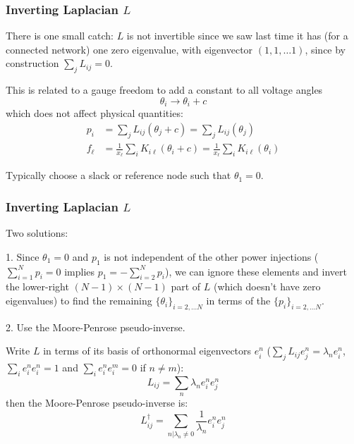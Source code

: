\documentclass[10pt,aspectratio=169,dvipsnames]{beamer}
\def\l{\lambda}
\begin{document}
\begin{frame}
  \frametitle{Inverting Laplacian $L$}

  There is one small catch: $L$ is \alert{not invertible} since we saw last
  time it has (for a connected network) one zero eigenvalue, with
  eigenvector $(1,1, \dots 1)$, since by construction $\sum_j L_{ij} =
  0$.

  This is related to a gauge freedom to add a constant to all voltage angles
  \begin{equation*}
    \theta_i \to \theta_i + c
  \end{equation*}
  which does not affect physical quantities:
    \begin{align*}
      p_i & = \sum_{j} L_{ij} (\theta_j+ c) = \sum_{j} L_{ij} (\theta_j)  \\
     f_\ell  & = \frac{1}{x_\ell}\sum_{i} K_{i\ell}( \theta_i  + c) = \frac{1}{x_\ell}\sum_{i} K_{i\ell}( \theta_i )
    \end{align*}

    Typically choose a \alert{slack} or \alert{reference node} such that  $\theta_1 = 0$.


\end{frame}

\begin{frame}
  \frametitle{Inverting Laplacian $L$}

  Two solutions:

  1. Since $\theta_1 = 0$ and $p_1$ is not independent of the other
  power injections ($\sum_{i=1}^N p_i = 0$ implies $p_1 = -
  \sum_{i=2}^N p_i$), we can ignore these elements and invert
  the lower-right $(N-1) \times (N-1)$ part of $L$ (which doesn't have zero eigenvalues) to find the
  remaining $\{\theta_i\}_{i=2,\dots N}$ in terms of the
  $\{p_i\}_{i=2,\dots N}$.

  2. Use the Moore-Penrose pseudo-inverse.

  Write $L$ in terms of its basis of orthonormal eigenvectors $e^n_i$ ($\sum_j L_{ij} e^n_j = \l_n e^n_i$, $\sum_i e^n_i e^n_i = 1$ and  $\sum_i e^n_i e^m_i = 0$ if $n \neq m$):
  \begin{equation*}
    L_{ij} = \sum_n \l_n e^n_i e^n_j
  \end{equation*}
  then the Moore-Penrose pseudo-inverse is:
  \begin{equation*}
    L^\dagger_{ij} = \sum_{n | \l_n \neq 0} \frac{1}{\l_n} e^n_i e^n_j
  \end{equation*}



\end{frame}
\end{document}
